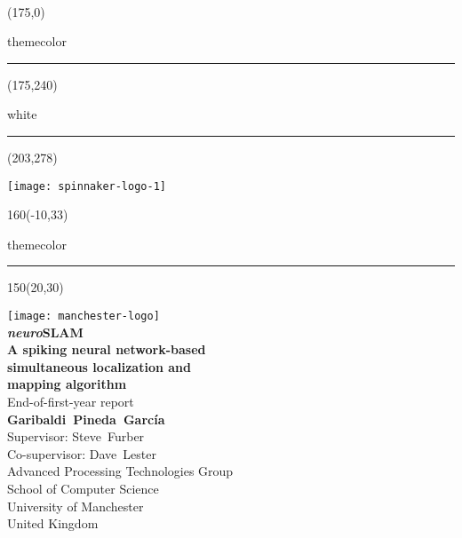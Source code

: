 \setlength{\TPHorizModule}{1mm}
\setlength{\TPVertModule}{1mm}
  ~
  \begin{textblock}{50}(175,0)
    \begin{color}{themecolor}
      \rule{3cm}{30cm}
    \end{color}
  \end{textblock}
  
  \begin{textblock}{50}(175,240)
    \begin{color}{white}
      \rule{32mm}{40mm}
    \end{color}
  \end{textblock}
  
  \begin{textblock}{20}(203,278)
    \begin{rotate}{90}
      \texttt{[image: spinnaker-logo-1]}
    \end{rotate}
  \end{textblock}
  
  \begin{textblock}{160}(-10,33)
    \begin{color}{themecolor}
      \rule{18.4cm}{2.2cm}
    \end{color}
  \end{textblock}


  
  \begin{textblock}{150}(20,30)
    \begin{flushright}
    \texttt{[image: manchester-logo]}\\[5em]
    
    {\noindent\Huge\bfseries \textsf{\textit{neuro}SLAM}\\ 
      A spiking neural network-based\\
      \vspace*{-0.1em}
      simultaneous localization and\\[0.3em] 
      mapping algorithm}\\[2em]
    
    {\noindent\huge End-of-first-year report }\\[5em]
    
    {\noindent\Large\bfseries Garibaldi~Pineda~García}\\[0.5em]
    {\noindent\Large Supervisor: Steve~Furber}\\[0.1em]
    {\noindent\Large Co-supervisor: Dave~Lester}\\[1em]
    {\noindent\large Advanced Processing Technologies Group\\
      School of Computer Science \\
      University of Manchester\\[0.4em]
      United Kingdom}
    \end{flushright}
  \end{textblock}

